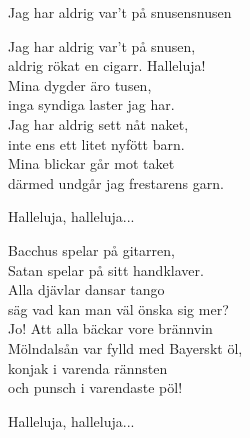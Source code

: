 \begin{song}{Jag har aldrig var't på snusen}{snusen}
\begin{vers}
Jag har aldrig var't på snusen,\\
aldrig rökat en cigarr. Halleluja!\\
Mina dygder äro tusen,\\
inga syndiga laster jag har.\\
Jag har aldrig sett nåt naket,\\
inte ens ett litet nyfött barn.\\
Mina blickar går mot taket\\
därmed undgår jag frestarens garn.\\
\end{vers}
\begin{vers}
Halleluja, halleluja...\\
\end{vers}
\begin{vers}
Bacchus spelar på gitarren,\\
Satan spelar på sitt handklaver.\\
Alla djävlar dansar tango\\
säg vad kan man väl önska sig mer?\\
Jo! Att alla bäckar vore brännvin\\
Mölndalsån var fylld med Bayerskt öl,\\
konjak i varenda rännsten\\
och punsch i varendaste pöl!\\
\end{vers}
\begin{vers}
Halleluja, halleluja...\\
\end{vers}
\end{song}
